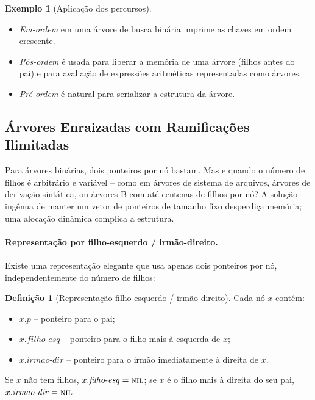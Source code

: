 \documentclass[9pt,a4paper]{extarticle}
\newcommand{\impt}[1]{\textcolor{important}{#1}}
\newcommand{\ntc}[1]{\textcolor{notice}{#1}}
\theoremstyle{definition}
\newtheorem{definition}{Definição}[section]
\newtheorem{example}{Exemplo}[section]
\begin{document}
\begin{example}[Aplicação dos percursos]
\hfill
\begin{itemize}
    \item \emph{Em-ordem} em uma árvore de busca binária imprime as chaves em ordem crescente.
    \item \emph{Pós-ordem} é usada para liberar a memória de uma árvore (filhos antes do pai) e para avaliação de expressões aritméticas representadas como árvores.
    \item \emph{Pré-ordem} é natural para serializar a estrutura da árvore.
\end{itemize}
\end{example}

\subsection{Árvores Enraizadas com Ramificações Ilimitadas}

Para árvores binárias, dois ponteiros por nó bastam. Mas e quando o número de filhos é arbitrário e variável -- como em árvores de sistema de arquivos, árvores de derivação sintática, ou árvores B com até centenas de filhos por nó? A solução ingênua de manter um vetor de ponteiros de tamanho fixo desperdiça memória; uma alocação dinâmica complica a estrutura.

\paragraph{Representação por filho-esquerdo / irmão-direito.} Existe uma \impt{representação elegante} que usa apenas dois ponteiros por nó, independentemente do número de filhos:

\begin{definition}[Representação filho-esquerdo / irmão-direito]
Cada nó $x$ contém:
\begin{itemize}
    \item $x.p$ -- ponteiro para o pai;
    \item $x.\mathit{filho\text{-}esq}$ -- ponteiro para o \ntc{filho mais à esquerda} de $x$;
    \item $x.\mathit{irmao\text{-}dir}$ -- ponteiro para o \ntc{irmão imediatamente à direita} de $x$.
\end{itemize}
Se $x$ não tem filhos, $x.\mathit{filho\text{-}esq} = \textsc{nil}$; se $x$ é o filho mais à direita do seu pai, $x.\mathit{irmao\text{-}dir} = \textsc{nil}$.
\end{definition}
\end{document}
